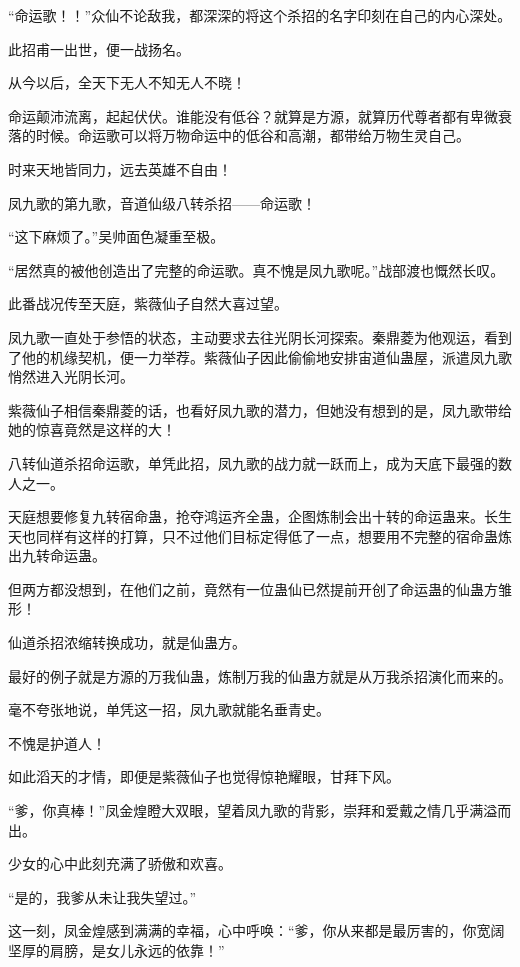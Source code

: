\begin{this_body}
“命运歌！！”众仙不论敌我，都深深的将这个杀招的名字印刻在自己的内心深处。

此招甫一出世，便一战扬名。

从今以后，全天下无人不知无人不晓！

命运颠沛流离，起起伏伏。谁能没有低谷？就算是方源，就算历代尊者都有卑微衰落的时候。命运歌可以将万物命运中的低谷和高潮，都带给万物生灵自己。

时来天地皆同力，远去英雄不自由！

凤九歌的第九歌，音道仙级八转杀招——命运歌！

“这下麻烦了。”吴帅面色凝重至极。

“居然真的被他创造出了完整的命运歌。真不愧是凤九歌呢。”战部渡也慨然长叹。

此番战况传至天庭，紫薇仙子自然大喜过望。

凤九歌一直处于参悟的状态，主动要求去往光阴长河探索。秦鼎菱为他观运，看到了他的机缘契机，便一力举荐。紫薇仙子因此偷偷地安排宙道仙蛊屋，派遣凤九歌悄然进入光阴长河。

紫薇仙子相信秦鼎菱的话，也看好凤九歌的潜力，但她没有想到的是，凤九歌带给她的惊喜竟然是这样的大！

八转仙道杀招命运歌，单凭此招，凤九歌的战力就一跃而上，成为天底下最强的数人之一。

天庭想要修复九转宿命蛊，抢夺鸿运齐全蛊，企图炼制会出十转的命运蛊来。长生天也同样有这样的打算，只不过他们目标定得低了一点，想要用不完整的宿命蛊炼出九转命运蛊。

但两方都没想到，在他们之前，竟然有一位蛊仙已然提前开创了命运蛊的仙蛊方雏形！

仙道杀招浓缩转换成功，就是仙蛊方。

最好的例子就是方源的万我仙蛊，炼制万我的仙蛊方就是从万我杀招演化而来的。

毫不夸张地说，单凭这一招，凤九歌就能名垂青史。

不愧是护道人！

如此滔天的才情，即便是紫薇仙子也觉得惊艳耀眼，甘拜下风。

“爹，你真棒！”凤金煌瞪大双眼，望着凤九歌的背影，崇拜和爱戴之情几乎满溢而出。

少女的心中此刻充满了骄傲和欢喜。

“是的，我爹从未让我失望过。”

这一刻，凤金煌感到满满的幸福，心中呼唤：“爹，你从来都是最厉害的，你宽阔坚厚的肩膀，是女儿永远的依靠！”

\end{this_body}

